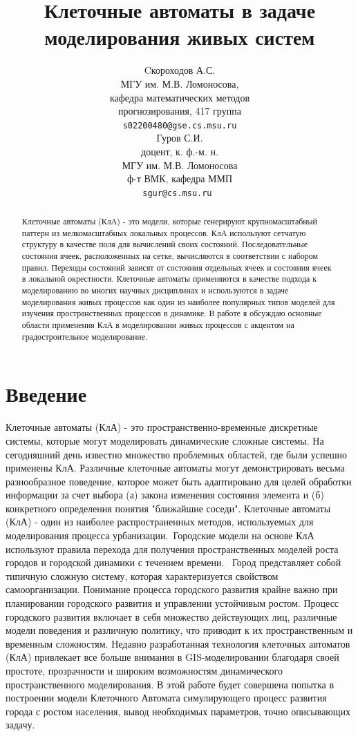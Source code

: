 \documentclass{article}
\title{Клеточные автоматы в задаче моделирования живых систем}
\author{ Cкороходов А.С. \\
	МГУ им. М.В. Ломоносова, \\
	кафедра математических методов \\ прогнозирования, 417 группа\\
	\texttt{s02200480@gse.cs.msu.ru} \\
	\And
	Гуров С.И. \\
	доцент, к. ф.-м. н.\\
	МГУ им. М.В. Ломоносова\\
	ф-т ВМК, кафедра ММП\\
	\texttt{sgur@cs.msu.ru } \\
}
\date{}
\begin{document}
\maketitle

\begin{abstract}
	Клеточные автоматы (КлА) - это модели, которые генерируют крупномасштабный паттерн из мелкомасштабных локальных процессов. КлА используют сетчатую структуру в качестве поля для вычислений своих состояний. Последовательные состояния ячеек, расположенных на сетке, вычисляются в соответствии с набором правил. Переходы состояний зависят от состояния отдельных ячеек и состояния ячеек в локальной окрестности. Клеточные автоматы применяются в качестве подхода к моделированию во многих научных дисциплинах и используются в задаче моделирования живых процессов как один из наиболее популярных типов моделей для изучения пространственных процессов в динамике. В работе я обсуждаю основные области применения КлА в моделировании живых процессов с акцентом на градостроительное моделирование.
\end{abstract}



\section{Введение}
	Клеточные автоматы (КлА) - это пространственно-временные дискретные системы, которые могут моделировать динамические сложные системы. На сегодняшний день известно множество проблемных областей, где были успешно применены КлА. 
	Различные клеточные автоматы могут демонстрировать весьма разнообразное поведение, которое может быть адаптировано для целей обработки информации за счет выбора (а) закона изменения состояния элемента и (б) конкретного определения понятия "ближайшие соседи".
	Клеточные автоматы (КлА) - один из наиболее распространенных методов, используемых для моделирования процесса урбанизации. Городские модели на основе КлА используют правила перехода для получения пространственных моделей роста городов и городской динамики с течением времени. 
	Город представляет собой типичную сложную систему, которая характеризуется свойством самоорганизации. Понимание процесса городского развития крайне важно при планировании городского развития и управлении устойчивым ростом. Процесс городского развития включает в себя множество действующих лиц, различные модели поведения и различную политику, что приводит к их пространственным и временным сложностям. Недавно разработанная технология клеточных автоматов (КлА) привлекает все больше внимания в GIS-моделировании благодаря своей простоте, прозрачности и  широким возможностям динамического пространственного моделирования.
	В этой работе будет совершена попытка в построении модели Клеточного Автомата симулирующего процесс развития города с ростом населения, вывод необходимых параметров, точно описывающих задачу.
\end{document}
